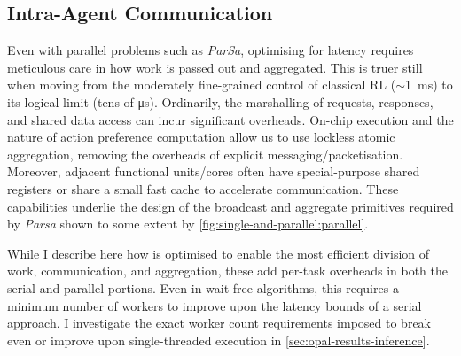 \subsection{Intra-Agent Communication}\label{sec:intra-agent-communication}
Even with parallel problems such as \emph{ParSa}, optimising for latency requires meticulous care in how work is passed out and aggregated.
This is truer still when moving from the moderately fine-grained control of classical RL ($\sim$\qty{1}{\milli\second}) to its logical limit (tens of \si{\micro\second}).
Ordinarily, the marshalling of requests, responses, and shared data access can incur significant overheads.
On-chip execution and the nature of action preference computation allow us to use lockless atomic aggregation, removing the overheads of explicit messaging/packetisation.
Moreover, adjacent functional units/cores often have special-purpose shared registers or share a small fast cache to accelerate communication.
These capabilities underlie the design of the broadcast and aggregate primitives required by \emph{Parsa} shown to some extent by \cref{fig:single-and-parallel:parallel}.

While I describe here how \approachshort{} is optimised to enable the most efficient division of work, communication, and aggregation, these add per-task overheads in both the serial and parallel portions.
Even in wait-free algorithms, this requires a minimum number of workers to improve upon the latency bounds of a serial approach.
I investigate the exact worker count requirements imposed to break even or improve upon single-threaded execution in \cref{sec:opal-results-inference}.


%

